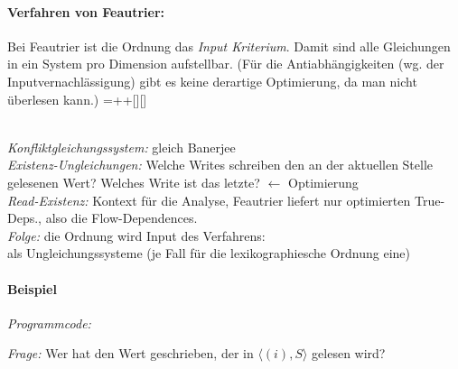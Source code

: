\paragraph{Verfahren von Feautrier:}
Bei Feautrier ist die Ordnung das \emph{Input Kriterium}. Damit sind alle Gleichungen in ein System pro Dimension aufstellbar. (Für die Antiabhängigkeiten (wg. der Inputvernachlässigung) gibt es keine derartige Optimierung, da man nicht überlesen kann.)
\entrymodifiers={++[][]}


~\\[0.5cm]
\emph{Konfliktgleichungssystem:} gleich Banerjee\\[0.2cm]
\emph{Existenz-Ungleichungen:} Welche \glqq Writes \grqq schreiben den an der aktuellen Stelle gelesenen Wert? Welches \glqq Write \grqq ist das letzte? $\leftarrow$ Optimierung\\[0.2cm]
\emph{Read-Existenz:} Kontext für die Analyse, Feautrier liefert nur optimierten True-Deps., also die Flow-Dependences.\\[0.2cm]
\emph{Folge:} die Ordnung wird Input des Verfahrens:\\
als Ungleichungssysteme (je Fall für die lexikographiesche Ordnung eine)

\paragraph{Beispiel}
\textit{Programmcode:}

\begin{procedure}[H]
\SetAlgoLined
{}
\end{procedure}

\textit{Frage:} Wer hat den Wert geschrieben, der in $\langle (i),S \rangle$ gelesen wird?\\


